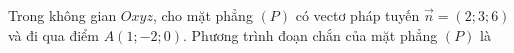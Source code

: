 \begin{ex}
Trong không gian $Oxyz$, cho mặt phẳng $(P)$ có vectơ pháp tuyến $\vec n=(2;3;6)$ và đi qua điểm $A(1;-2;0)$. Phương trình đoạn chắn của mặt phẳng $(P)$ là
\end{ex}
